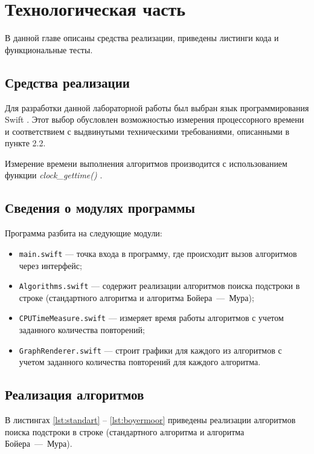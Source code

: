 \chapter{Технологическая часть}

В данной главе описаны средства реализации, приведены листинги кода и функциональные тесты.

\section{Средства реализации}

Для разработки данной лабораторной работы был выбран язык программирования Swift \cite{swift}. 
Этот выбор обусловлен возможностью измерения процессорного времени \cite{cpu-time-measure} и соответствием с выдвинутыми техническими требованиями, описанными в пункте 2.2.

Измерение времени выполнения алгоритмов производится с использованием функции \textit{clock\_gettime()} \cite{cpu-time-measure}.
\section{Сведения о модулях программы}

Программа разбита на следующие модули:

\begin{itemize}
	\item \texttt{main.swift} --- точка входа в программу, где происходит вызов алгоритмов через интерфейс;
	\item \texttt{Algorithms.swift} --- содержит реализации алгоритмов поиска подстроки в строке (стандартного алгоритма и алгоритма Бойера~---~Мура);
	\item \texttt{CPUTimeMeasure.swift} --- измеряет время работы алгоритмов с учетом заданного количества повторений;
	\item \texttt{GraphRenderer.swift} --- строит графики для каждого из алгоритмов с учетом заданного количества повторений для каждого алгоритма.
\end{itemize}

\section{Реализация алгоритмов}

В листингах \ref{lst:standart} -- \ref{lst:boyermoor} приведены реализации алгоритмов поиска подстроки в строке (стандартного алгоритма и алгоритма Бойера~---~Мура).

